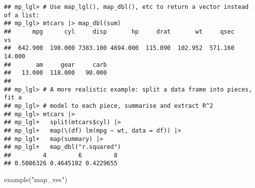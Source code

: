 \documentclass[
]{book}
\newenvironment{Shaded}{\begin{snugshade}}{\end{snugshade}}
\newcommand{\FunctionTok}[1]{\textcolor[rgb]{0.00,0.00,0.00}{#1}}
\newcommand{\NormalTok}[1]{#1}
\newcommand{\StringTok}[1]{\textcolor[rgb]{0.31,0.60,0.02}{#1}}
\begin{document}
\begin{verbatim}
## mp_lgl> # Use map_lgl(), map_dbl(), etc to return a vector instead of a list:
## mp_lgl> mtcars |> map_dbl(sum)
##      mpg      cyl     disp       hp     drat       wt     qsec       vs 
##  642.900  198.000 7383.100 4694.000  115.090  102.952  571.160   14.000 
##       am     gear     carb 
##   13.000  118.000   90.000 
## 
## mp_lgl> # A more realistic example: split a data frame into pieces, fit a
## mp_lgl> # model to each piece, summarise and extract R^2
## mp_lgl> mtcars |>
## mp_lgl+   split(mtcars$cyl) |>
## mp_lgl+   map(\(df) lm(mpg ~ wt, data = df)) |>
## mp_lgl+   map(summary) |>
## mp_lgl+   map_dbl("r.squared")
##         4         6         8 
## 0.5086326 0.4645102 0.4229655
\end{verbatim}

\begin{Shaded}
\begin{Highlighting}[]
\FunctionTok{example}\NormalTok{(}\StringTok{"map\_vec"}\NormalTok{)}
\end{Highlighting}
\end{Shaded}
\end{document}
